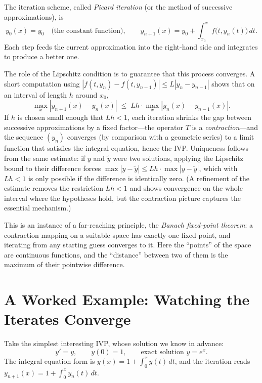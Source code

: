 \documentclass{essay}
\begin{document}
The iteration scheme, called \emph{Picard iteration} (or the method of successive approximations), is
\[ y_{0}(x) = y_{0} \quad \text{(the constant function)}, \qquad y_{n+1}(x) = y_{0} + \int_{x_{0}}^{x} f\bigl(t, y_{n}(t)\bigr)\, dt. \]
Each step feeds the current approximation into the right-hand side and integrates to produce a better one.

The role of the Lipschitz condition is to guarantee that this process converges. A short computation using \(|f(t, y_{n}) - f(t, y_{n-1})| \leq L |y_{n} - y_{n-1}|\) shows that on an interval of length \(h\) around \(x_{0}\),
\[ \max_{x} |y_{n+1}(x) - y_{n}(x)| \;\leq\; Lh \cdot \max_{x} |y_{n}(x) - y_{n-1}(x)|. \]
If \(h\) is chosen small enough that \(Lh < 1\), each iteration shrinks the gap between successive approximations by a fixed factor---the operator \(T\) is a \emph{contraction}---and the sequence \((y_{n})\) converges (by comparison with a geometric series) to a limit function that satisfies the integral equation, hence the IVP. Uniqueness follows from the same estimate: if \(y\) and \(\tilde{y}\) were two solutions, applying the Lipschitz bound to their difference forces \(\max |y - \tilde{y}| \leq Lh \cdot \max |y - \tilde{y}|\), which with \(Lh < 1\) is only possible if the difference is identically zero. (A refinement of the estimate removes the restriction \(Lh<1\) and shows convergence on the whole interval where the hypotheses hold, but the contraction picture captures the essential mechanism.)

This is an instance of a far-reaching principle, the \emph{Banach fixed-point theorem}: a contraction mapping on a suitable space has exactly one fixed point, and iterating from any starting guess converges to it. Here the ``points'' of the space are continuous functions, and the ``distance'' between two of them is the maximum of their pointwise difference.

\section{A Worked Example: Watching the Iterates Converge}

Take the simplest interesting IVP, whose solution we know in advance:
\[ y' = y, \qquad y(0) = 1, \qquad \text{exact solution } y = e^{x}. \]
The integral-equation form is \(y(x) = 1 + \int_{0}^{x} y(t)\, dt\), and the iteration reads \(y_{n+1}(x) = 1 + \int_{0}^{x} y_{n}(t)\, dt\).
\end{document}
